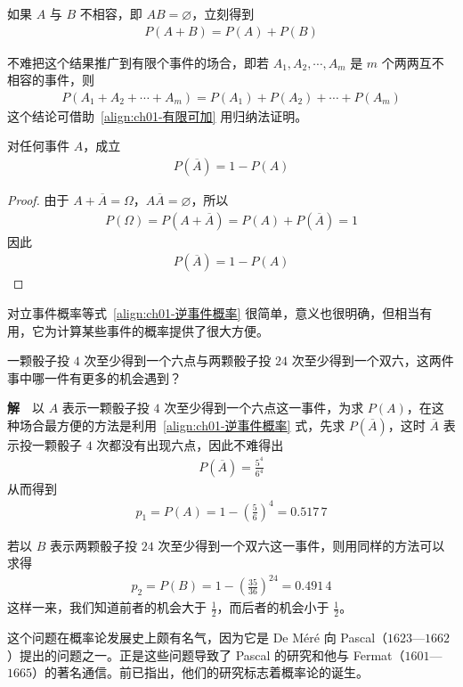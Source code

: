 \documentclass[../../main.tex]{subfiles}
\begin{document}
如果 $A$ 与 $B$ 不相容，即 $AB=\varnothing$，立刻得到
\begin{align}
P(A+B)=P(A)+P(B)\label{align:ch01-有限可加}
\end{align}

不难把这个结果推广到有限个事件的场合，即若 $A_1,A_2,\cdots,A_m$ 是 $m$ 个两两互不相容的事件，则
\begin{align}
P(A_1+A_2+\cdots+A_m)=P(A_1)+P(A_2)+\cdots+P(A_m)\label{align:ch01-有限可加推广}
\end{align}
这个结论可借助~\eqref{align:ch01-有限可加} 用归纳法证明。

\begin{theorem}[逆事件概率]\label{theorem:ch01-逆事件概率}
对任何事件 $A$，成立
\begin{align}
P(\overline{A})=1-P(A)\label{align:ch01-逆事件概率}
\end{align}
\end{theorem}

\begin{proof}
由于 $A+\overline{A}=\Omega$，$A\overline{A}=\varnothing$，所以
\begin{align*}
P(\Omega)=P(A+\overline{A})=P(A)+P(\overline{A})=1
\end{align*}
因此
\begin{align*}
P(\overline{A})=1-P(A)
\end{align*}
\end{proof}

对立事件概率等式~\eqref{align:ch01-逆事件概率} 很简单，意义也很明确，但相当有用，它为计算某些事件的概率提供了很大方便。

\begin{example}[De Méré 问题]\label{example:ch01-de-mere}
一颗骰子投 $4$ 次至少得到一个六点与两颗骰子投 $24$ 次至少得到一个双六，这两件事中哪一件有更多的机会遇到？

\textbf{解}~~以 $A$ 表示一颗骰子投 $4$ 次至少得到一个六点这一事件，为求 $P(A)$，在这种场合最方便的方法是利用~\eqref{align:ch01-逆事件概率} 式，先求 $P(\overline{A})$，这时 $\overline{A}$ 表示投一颗骰子 $4$ 次都没有出现六点，因此不难得出
\begin{align*}
P(\overline{A})=\frac{5^4}{6^4}
\end{align*}
从而得到
\begin{align*}
p_1=P(A)=1-\left(\frac{5}{6}\right)^4=0.517\,7
\end{align*}

若以 $B$ 表示两颗骰子投 $24$ 次至少得到一个双六这一事件，则用同样的方法可以求得
\begin{align*}
p_2=P(B)=1-\left(\frac{35}{36}\right)^{24}=0.491\,4
\end{align*}
这样一来，我们知道前者的机会大于 $\frac{1}{2}$，而后者的机会小于 $\frac{1}{2}$。

这个问题在概率论发展史上颇有名气，因为它是 De Méré 向 Pascal（$1623$—$1662$）提出的问题之一。正是这些问题导致了 Pascal 的研究和他与 Fermat（$1601$—$1665$）的著名通信。前已指出，他们的研究标志着概率论的诞生。
\end{example}
\end{document}
